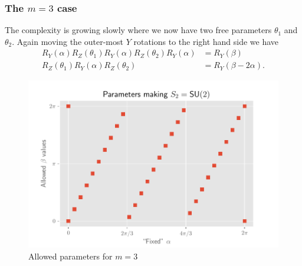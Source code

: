 \documentclass[12pt,dvipsnames]{article}
\newcommand{\1}{\mathbb{1}}
\theoremstyle{plain}
\begin{document}
\subsubsection{The $m = 3$ case}
The complexity is growing slowly where we now have two free parameters $\theta_1$ and $\theta_2$. Again moving the outer-most $Y$ rotations to the right hand side we have
\begin{align*}
    R_Y(\alpha)R_Z(\theta_1)R_Y(\alpha)R_Z(\theta_2)R_Y(\alpha) & = R_Y(\beta)            \\
    R_Z(\theta_1)R_Y(\alpha)R_Z(\theta_2)                       & = R_Y(\beta - 2\alpha).
\end{align*}
\begin{figure}[h]
    \begin{minipage}[c]{0.7\textwidth}
        \includegraphics[width=\textwidth]{../su2/s2.pdf}
    \end{minipage}\hfill
    \begin{minipage}[c]{0.3\textwidth}
        \caption{Allowed parameters for $m = 3$}\label{fig:m=3}
    \end{minipage}
\end{figure}
\end{document}

